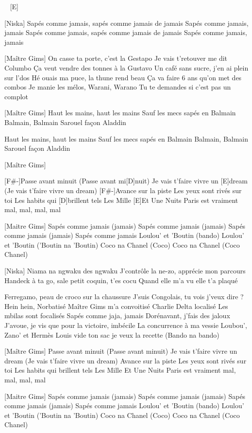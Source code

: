 
\begin{guitar}
[F#-] ~ [E]

[Niska]
Sapés comme jamais, sapés comme jamais de jamais
Sapés comme jamais, jamais
Sapés comme jamais, sapés comme jamais de jamais
Sapés comme jamais, jamais

[Maître Gims]
On casse ta porte, c'est la Gestapo
Je vais t'retouver me dit Columbo
Ça veut vendre des tonnes à la Gustavo
Un café sans sucre, j'en ai plein sur l'dos
Hé ouais ma puce, la thune rend beau
Ça va faire 6 ans qu'on met des combos
Je manie les mélos, Warani, Warano
Tu te demandes si c'est pas un complot

[Maître Gims]
Haut les mains, haut les mains
Sauf les mecs sapés en Balmain
Balmain, Balmain
Sarouel façon Aladdin

Haut les mains, haut les mains
Sauf les mecs sapés en Balmain
Balmain, Balmain
Sarouel façon Aladdin

[Maître Gims]

[F#-]Passe avant minuit (Passe avant mi[D]nuit)
Je vais t'faire vivre un [E]dream (Je vais t'faire vivre un dream)
[F#-]Avance sur la piste
Les yeux sont rivés sur toi
Les habits qui [D]brillent tels Les Mille [E]Et Une Nuits
Paris est vraiment mal, mal, mal, mal

[Maitre Gims]
Sapés comme jamais (jamais)
Sapés comme jamais (jamais)
Sapés comme jamais (jamais)
Sapés comme jamais
Loulou' et 'Boutin (bando)
Loulou' et 'Boutin ('Boutin na 'Boutin)
Coco na Chanel (Coco)
Coco na Chanel (Coco Chanel)

[Niska]
Niama na ngwaku des ngwaku
J'contrôle la ne-zo, apprécie mon parcours
Handeck à ta go, sale petit coquin, t'es cocu
Quand elle m'a vu elle t'a plaqué

Ferregamo, peau de croco sur la chaussure
J'suis Congolais, tu vois j'veux dire ?
Hein hein, Norbatisé
Maître Gims m'a convoitisé
Charlie Delta localisé
Les mbilas sont focalisés
Sapés comme jaja, jamais
Dorénavant, j'fais des jaloux
J'avoue, je vis que pour la victoire, imbécile
La concurrence à ma vessie
Loubou', Zano' et Hermès
Louis vide ton sac je veux la recette
(Bando na bando)

[Maître Gims]
Passe avant minuit (Passe avant minuit)
Je vais t'faire vivre un dream (Je vais t'faire vivre un dream)
Avance sur la piste
Les yeux sont rivés sur toi
Les habits qui brillent tels Les Mille Et Une Nuits
Paris est vraiment mal, mal, mal, mal

[Maitre Gims]
Sapés comme jamais (jamais)
Sapés comme jamais (jamais)
Sapés comme jamais (jamais)
Sapés comme jamais
Loulou' et 'Boutin (bando)
Loulou' et 'Boutin ('Boutin na 'Boutin)
Coco na Chanel (Coco)
Coco na Chanel (Coco Chanel)


\end{guitar}
